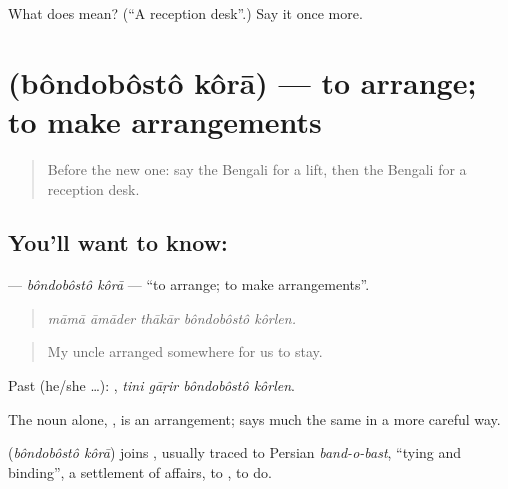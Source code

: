 \begin{tcolorbox}[breakable,colback=teal!4,colframe=teal!35!black,title={Before you move on}]
What does  mean? (\textquotedblleft{}A reception desk\textquotedblright{}.) Say it once more.
\end{tcolorbox}
\section[\texorpdfstring{\bn{বন্দোবস্ত} \bn{করা} (bôndobôstô kôrā)}{বন্দোবস্ত করা (bôndobôstô kôrā)}]{  (bôndobôstô kôrā) — to arrange; to make arrangements}

\label{lesson:BN-C403-bondobosto-kora}



\begin{quote}
Before the new one: say the Bengali for a lift, then the Bengali for a reception desk.
\end{quote}

\subsection*{You'll want to know:  }
\textbf{ } — \emph{bôndobôstô kôrā} — \textquotedblleft{}to arrange; to make arrangements\textquotedblright{}.

\begin{quote}
    
\end{quote}

\begin{quote}
\emph{māmā āmāder thākār bôndobôstô kôrlen.}
\end{quote}

\begin{quote}
My uncle arranged somewhere for us to stay.
\end{quote}

Past (he/she …):    , \emph{tini gāṛir bôndobôstô kôrlen}.

The noun alone, , is an arrangement;  says much the same in a more careful way.

\begin{cousinweb}
\textbf{ } (\emph{bôndobôstô kôrā}) joins , usually traced to Persian \emph{band-o-bast}, \textquotedblleft{}tying and binding\textquotedblright{}, a settlement of affairs, to , to do.
\end{cousinweb}

